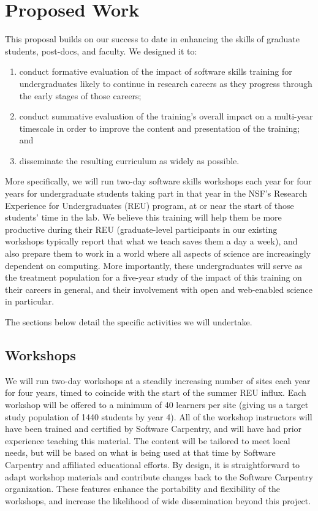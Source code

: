 \documentclass[11pt]{article}
\begin{document}
\section{Proposed Work}

This proposal builds on our success to date in enhancing the skills of
graduate students, post-docs, and faculty.  We designed it to:

\begin{enumerate}

\item
  conduct formative evaluation of the impact of software skills
  training for undergraduates likely to continue in research careers
  as they progress through the early stages of those careers;

\item
  conduct summative evaluation of the training's overall impact on a
  multi-year timescale in order to improve the content and
  presentation of the training; and

\item
  disseminate the resulting curriculum as widely as possible.

\end{enumerate}

More specifically, we will run two-day software skills workshops each
year for four years for undergraduate students taking part in that
year in the NSF's Research Experience for Undergraduates (REU)
program, at or near the start of those students' time in the lab.  We
believe this training will help them be more productive during their
REU (graduate-level participants in our existing workshops typically
report that what we teach saves them a day a week), and also prepare
them to work in a world where all aspects of science are increasingly
dependent on computing.  More importantly, these undergraduates will
serve as the treatment population for a five-year study of the impact
of this training on their careers in general, and their involvement
with open and web-enabled science in particular.

The sections below detail the specific activities we will undertake.

\subsection{Workshops}

We will run two-day workshops at a steadily increasing number of sites
each year for four years, timed to coincide with the start of the
summer REU influx.  Each workshop will be offered to a minimum of 40
learners per site (giving us a target study population of 1440
students by year 4).  All of the
workshop instructors will have been trained and certified by Software
Carpentry, and will have had prior experience teaching this material.
The content will be tailored to meet local
needs, but will be based on what is being used at that time by
Software Carpentry and affiliated educational efforts.  By design, it is straightforward to adapt workshop materials and contribute changes back to the Software Carpentry organization.  These features enhance the portability and flexibility of the workshops, and increase the likelihood of wide dissemination beyond this project.  
\end{document}
